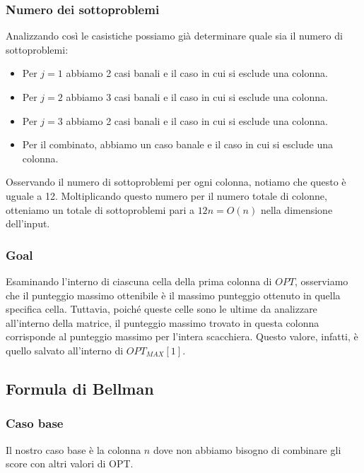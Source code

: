 \subsubsection*{Numero dei sottoproblemi}

Analizzando così le casistiche possiamo già determinare quale sia il numero di sottoproblemi:

\begin{itemize}
	\item Per $j = 1$ abbiamo 2 casi banali e il caso in cui si esclude una colonna.
	\item Per $j = 2$ abbiamo 3 casi banali e il caso in cui si esclude una colonna.
	\item Per $j = 3$ abbiamo 2 casi banali e il caso in cui si esclude una colonna.
	\item Per il combinato, abbiamo un caso banale e il caso in cui si esclude una colonna.
\end{itemize}

Osservando il numero di sottoproblemi per ogni colonna, notiamo che questo è uguale a 12. 
Moltiplicando questo numero per il numero totale di colonne, otteniamo un totale di sottoproblemi pari a $12n = O(n)$ nella dimensione dell'input. 

\subsubsection*{Goal}

Esaminando l'interno di ciascuna cella della prima colonna di $OPT$, osserviamo che il punteggio massimo ottenibile è il massimo punteggio ottenuto
in quella specifica cella. Tuttavia, poiché queste celle sono le ultime da analizzare all'interno della matrice, il punteggio massimo trovato in
questa colonna corrisponde al punteggio massimo per l'intera scacchiera.
Questo valore, infatti, è quello salvato all'interno di $OPT_{MAX}[1]$.

\subsection{Formula di Bellman}


\subsubsection*{Caso base}

Il nostro caso base è la colonna $n$ dove non abbiamo bisogno di combinare gli score con altri valori di OPT.

